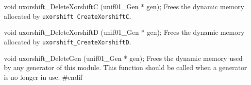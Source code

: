 
\code

void uxorshift_DeleteXorshiftC (unif01_Gen * gen);
\endcode
 \tab Frees the dynamic memory allocated by {\tt uxorshift\_CreateXorshiftC}.
 \endtab
\code


void uxorshift_DeleteXorshiftD (unif01_Gen * gen);
\endcode
 \tab Frees the dynamic memory allocated by {\tt uxorshift\_CreateXorshiftD}.
 \endtab
\code


void uxorshift_DeleteGen (unif01_Gen * gen);
\endcode
  \tab Frees the dynamic memory used by any generator of this module.
  This function should be called when a generator
  is no longer in use.
 \endtab
\code\hide
#endif
\endhide
\endcode
